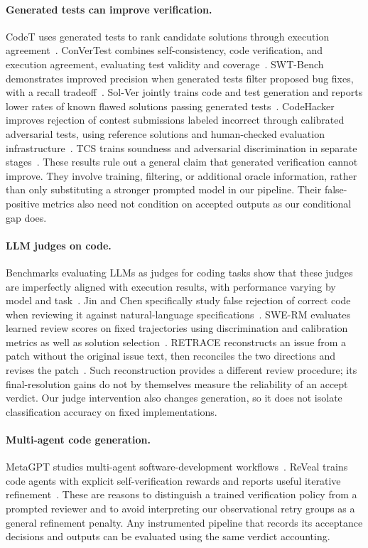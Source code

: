 \documentclass{article}
\begin{document}
\paragraph{Generated tests can improve verification.}
CodeT uses generated tests to rank candidate solutions through execution
agreement~\cite{chen2023codet}. ConVerTest combines self-consistency, code verification, and
execution agreement, evaluating test validity and coverage~\cite{convertest2026}.
SWT-Bench demonstrates improved precision when generated tests filter proposed
bug fixes, with a recall tradeoff~\cite{mundler2024swtbench}. Sol-Ver jointly trains
code and test generation and reports lower rates of known flawed solutions passing
generated tests~\cite{lin2025solver}. CodeHacker improves rejection of contest
submissions labeled incorrect through calibrated adversarial tests, using reference solutions and
human-checked evaluation infrastructure~\cite{shi2026codehacker}. TCS trains soundness
and adversarial discrimination in separate stages~\cite{xu2026tcs}. These results rule
out a general claim that generated verification cannot improve. They involve training,
filtering, or additional oracle information, rather than only substituting a stronger
prompted model in our pipeline. Their false-positive metrics also need not condition on
accepted outputs as our conditional gap does.

\paragraph{LLM judges on code.}
Benchmarks evaluating LLMs as judges for coding tasks show that these judges are imperfectly
aligned with execution results, with performance varying by model and task~\cite{jiang2025codejudgebench}.
Jin and Chen specifically study false rejection of correct code when reviewing it against
natural-language specifications~\cite{verifyfailures2025}. SWE-RM evaluates learned
review scores on fixed trajectories using discrimination and calibration metrics as well
as solution selection~\cite{shum2025swerm}. RETRACE reconstructs an issue from a patch
without the original issue text, then reconciles the two directions and revises the
patch~\cite{li2026retrace}. Such reconstruction provides a different review procedure;
its final-resolution gains do not by themselves measure the reliability of an accept verdict.
Our judge intervention also changes generation, so it does not isolate classification
accuracy on fixed implementations.

\paragraph{Multi-agent code generation.}
MetaGPT studies multi-agent software-development workflows~\cite{hong2024metagpt}.
ReVeal trains code agents with explicit self-verification rewards and reports useful
iterative refinement~\cite{jin2025reveal}. These are reasons to distinguish a trained
verification policy from a prompted reviewer and to avoid interpreting our observational
retry groups as a general refinement penalty. Any instrumented pipeline that records its
acceptance decisions and outputs can be evaluated using the same verdict accounting.
\end{document}
